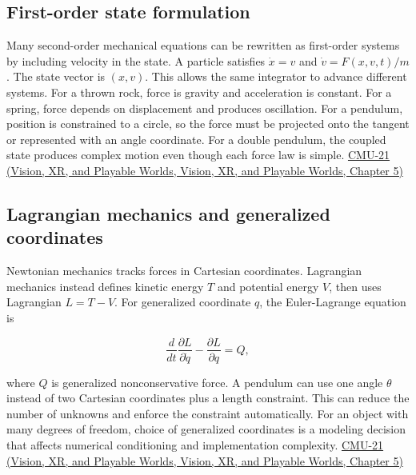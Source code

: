 \subsection{First-order state formulation}\label{04-visual-computing-ii-ch029-first-order-state-formulation}

Many second-order mechanical equations can be rewritten as first-order systems by including velocity in the state. A particle satisfies \(\dot x=v\) and \(\dot v=F(x,v,t)/m\). The state vector is \((x,v)\). This allows the same integrator to advance different systems. For a thrown rock, force is gravity and acceleration is constant. For a spring, force depends on displacement and produces oscillation. For a pendulum, position is constrained to a circle, so the force must be projected onto the tangent or represented with an angle coordinate. For a double pendulum, the coupled state produces complex motion even though each force law is simple. \href{../07-Vision-XR-and-Playable-Worlds/main.pdf\#nameddest=04-visual-computing-ii-ch036-cmu-21---dynamics-and-time-integration}{CMU-21 (Vision, XR, and Playable Worlds, Vision, XR, and Playable Worlds, Chapter 5)}

\subsection{Lagrangian mechanics and generalized coordinates}\label{04-visual-computing-ii-ch029-lagrangian-mechanics-and-generalized-coordinates}

Newtonian mechanics tracks forces in Cartesian coordinates. Lagrangian mechanics instead defines kinetic energy \(T\) and potential energy \(V\), then uses Lagrangian \(L=T-V\). For generalized coordinate \(q\), the Euler-Lagrange equation is

\[
\frac{d}{dt}\frac{\partial L}{\partial\dot q}-\frac{\partial L}{\partial q}=Q,
\]

where \(Q\) is generalized nonconservative force. A pendulum can use one angle \(\theta\) instead of two Cartesian coordinates plus a length constraint. This can reduce the number of unknowns and enforce the constraint automatically. For an object with many degrees of freedom, choice of generalized coordinates is a modeling decision that affects numerical conditioning and implementation complexity. \href{../07-Vision-XR-and-Playable-Worlds/main.pdf\#nameddest=04-visual-computing-ii-ch036-cmu-21---dynamics-and-time-integration}{CMU-21 (Vision, XR, and Playable Worlds, Vision, XR, and Playable Worlds, Chapter 5)}

